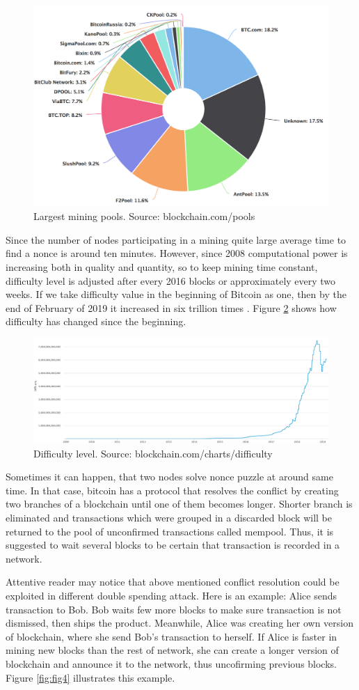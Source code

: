 \documentclass[conference,compsoc]{IEEEtran}
\begin{document}
\begin{figure}[h]
  \centering
  \includegraphics[width=.45\textwidth]{graphics/pools.png}
  \caption[Caption]{Largest mining pools. Source: blockchain.com/pools}
  \label{fig:pools}
\end{figure}


Since the number of nodes participating in a mining quite large average time to find a nonce is around ten minutes. 
However, since 2008 computational power is increasing both in quality and quantity, so to keep mining time constant, difficulty level is adjusted after every 2016 blocks or approximately every two weeks. 
If we take difficulty value in the beginning of Bitcoin as one, then by the end of February of 2019 it increased in six trillion times \cite{blockchain}.
Figure \ref{fig:fig3} shows how difficulty has changed since the beginning.

\begin{figure}[h]
  \centering
  \includegraphics[width=.45\textwidth]{graphics/target.png}
  \caption[Caption]{Difficulty level. Source: blockchain.com/charts/difficulty}
  \label{fig:fig3}
\end{figure}


Sometimes it can happen, that two nodes solve nonce puzzle at around same time. 
In that case, bitcoin has a protocol that resolves the conflict by creating two branches of a blockchain until one of them becomes longer.
Shorter branch is eliminated and transactions which were grouped in a discarded block will be returned to the pool of unconfirmed transactions called mempool.
Thus, it is suggested to wait several blocks to be certain that transaction is recorded in a network.

Attentive reader may notice that above mentioned conflict resolution could be exploited in different double spending attack. 
Here is an example: Alice sends transaction to Bob. 
Bob waits few more blocks to make sure transaction is not dismissed, then ships the product.
Meanwhile, Alice was creating her own version of blockchain, where she send Bob's transaction to herself. 
If Alice is faster in mining new blocks than the rest of network, she can create a longer version of blockchain and announce it to the network, thus uncofirming previous blocks.
Figure \ref{fig:fig4} illustrates this example.
\end{document}
